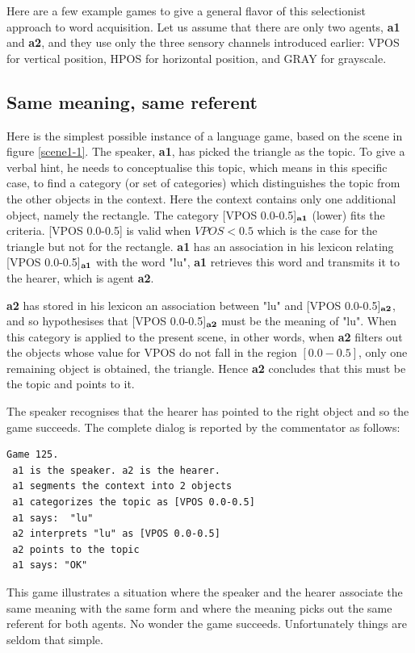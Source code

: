 Here are a few example games to give a general 
flavor of this selectionist approach to word acquisition. 
Let us assume that there are only two 
agents, {\bf a1} and {\bf a2}, and they use only the 
three sensory channels introduced earlier: VPOS for 
vertical position, HPOS for horizontal position, and GRAY
for grayscale. 

\subsection{Same meaning, same referent}

Here is the simplest possible instance of a
language game, based on the scene in figure \ref{scene1-1}. 
The speaker, {\bf a1}, has picked the triangle as the topic.
To give a verbal hint, he needs 
to conceptualise this topic, which means in this 
specific case, to find a 
category (or set of categories) which distinguishes the 
topic from the other objects in the context. Here 
the context contains only one additional 
object, namely the rectangle. The category
[VPOS 0.0-0.5]$_{\bf a1}$ (lower) fits the criteria. 
[VPOS 0.0-0.5] is valid when $VPOS < 0.5$
which is the case for the triangle but not for the rectangle. 
{\bf a1} has an association in his lexicon 
relating [VPOS 0.0-0.5]$_{\bf a1}$ with the word "lu", 
{\bf a1} retrieves this word and transmits it to 
the hearer, which is agent {\bf a2}. 

{\bf a2} has stored in his lexicon an
association between "lu" and [VPOS 0.0-0.5]$_{\bf a2}$, and so
hypothesises that [VPOS 0.0-0.5]$_{\bf a2}$ must be the meaning of "lu". 
When this category is applied to the present scene, in other words,
when {\bf a2} filters out the objects whose value for VPOS do not 
fall in the region $[0.0-0.5]$, only one 
remaining object is obtained, the triangle. Hence {\bf a2} concludes that 
this must be the topic and points to it. 

The speaker recognises that the hearer has pointed
to the right object and so the game succeeds. The complete
dialog is reported by the commentator as follows: 
\begin{verbatim}
Game 125.
 a1 is the speaker. a2 is the hearer. 
 a1 segments the context into 2 objects
 a1 categorizes the topic as [VPOS 0.0-0.5]
 a1 says:  "lu"
 a2 interprets "lu" as [VPOS 0.0-0.5]
 a2 points to the topic 
 a1 says: "OK" 
\end{verbatim}
This game illustrates a situation 
where the speaker and the hearer associate the same meaning
with the same form and where the meaning 
picks out the same referent for both agents. No wonder
the game succeeds. Unfortunately things are seldom that simple. 

